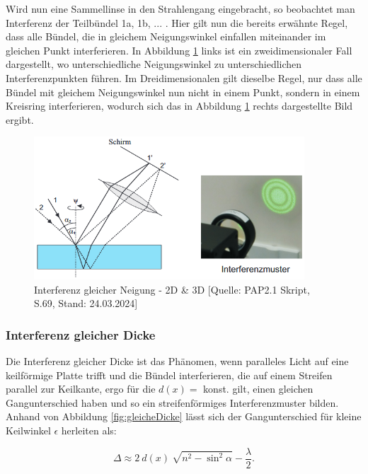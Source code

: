 \documentclass{article}
\begin{document}
Wird nun eine Sammellinse in den Strahlengang eingebracht, so beobachtet man Interferenz der Teilbündel 1a, 1b, ... . Hier gilt nun die bereits erwähnte Regel, dass alle Bündel, die in gleichem Neigungswinkel einfallen miteinander im gleichen Punkt interferieren. In Abbildung \ref{fig:gleicheNeigung2} links ist ein zweidimensionaler Fall dargestellt, wo unterschiedliche Neigungswinkel zu unterschiedlichen Interferenzpunkten führen. Im Dreidimensionalen gilt dieselbe Regel, nur dass alle Bündel mit gleichem Neigungswinkel nun nicht in einem Punkt, sondern in einem Kreisring interferieren, wodurch sich das in Abbildung \ref{fig:gleicheNeigung2} rechts dargestellte Bild ergibt.

\phantom{.}

\begin{figure}[!h]
    \centering
    \includegraphics[width=0.9\textwidth]{graphics/skript/gleicheneigung2.png}
    \caption{Interferenz gleicher Neigung - 2D \& 3D [Quelle: PAP2.1 Skript, S.69, Stand: 24.03.2024]}
    \label{fig:gleicheNeigung2}
\end{figure}



\newpage
\subsubsection{Interferenz gleicher Dicke}

Die Interferenz gleicher Dicke ist das Phänomen, wenn paralleles Licht auf eine keilförmige Platte trifft und  die Bündel interferieren, die auf einem Streifen parallel zur Keilkante, ergo für die $d(x) = $ konst. gilt, einen gleichen Gangunterschied haben und so ein streifenförmiges Interferenzmuster bilden. Anhand von Abbildung \ref{fig:gleicheDicke} lässt sich der Gangunterschied für kleine Keilwinkel $\epsilon$ herleiten als:

\begin{equation}
    \Delta \approx 2 \ d(x) \ \sqrt{n^2 - \sin^2{\alpha}} - \frac{\lambda}{2}.
\end{equation}
\end{document}
